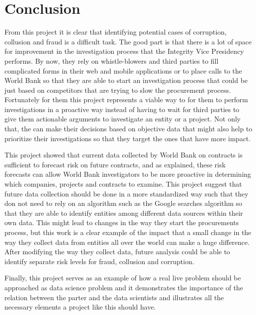 \chapter{Conclusion}\label{chap_conclusion}

From this project it is clear that identifying potential cases of corruption, collusion  and fraud is a difficult task. The good part is that there is a lot of space for improvement in the investigation process that the Integrity Vice Presidency performs. By now, they rely on whistle-blowers and third parties to fill complicated forms in their web  and mobile applications or to place calls to the World Bank so that they are able to start an investigation process that could be just based on competitors that are trying to slow the procurement process. Fortunately for them this project represents a viable way to for them to perform investigations in a proactive way instead of having to wait for third parties to give them actionable arguments to investigate an entity or a project. Not only that, the can make their decisions based on objective data that might also help to prioritize their investigations so that they target the ones that have more impact.

This project showed that current data collected by World Bank on contracts is sufficient to forecast risk on future contracts, and as explained, these risk forecasts can allow World Bank investigators to be more proactive in determining which companies, projects and contracts to examine. This project suggest that future data collection should be done in a more standardized way such that they don not need to rely on an algorithm such as the Google searches algorithm  so that they are able to identify entities among different data sources within their own data. This might lead to changes in the way they start the procurements process, but this work is a clear example of the impact that a small change in the way they collect data from entities all over the world can make a huge difference. After modifying the way they collect data, future analysis could be able to identify separate risk levels for fraud, collusion and corruption.

Finally, this project serves as an example of how a real live problem should be approached as data science problem and it demonstrates the importance of the relation between the parter and the data scientists and illustrates all the necessary elements a project like this should have.